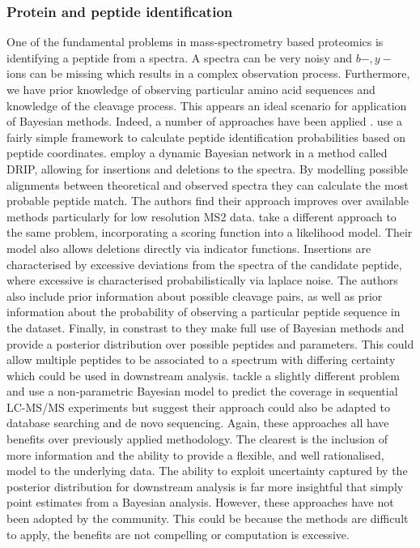 \documentclass[12pt,english]{article}
\begin{document}
\subsubsection{Protein and peptide identification}
One of the fundamental problems in mass-spectrometry based proteomics is identifying a peptide from a spectra. A spectra can be very noisy and $b-,y-$ ions can be missing which results in a complex observation process. Furthermore, we have prior knowledge of observing particular amino acid sequences and knowledge of the cleavage process. This appears an ideal scenario for application of Bayesian methods. Indeed, a number of approaches have been applied \citep{Chen::2005, Halloran::2016, Lewis::2018, Claassen::2009}. \citet{Chen::2005} use a fairly simple framework to calculate peptide identification probabilities based on peptide coordinates. \citet{Halloran::2016} employ a dynamic Bayesian network in a method called DRIP, allowing for insertions and deletions to the spectra. By modelling possible alignments between theoretical and observed spectra they can calculate the most probable peptide match. The authors find their approach improves over available methods particularly for low resolution MS2 data. \citet{Lewis::2018} take a different approach to the same problem, incorporating a scoring function into a likelihood model. Their model also allows deletions directly via indicator functions. Insertions are characterised by excessive deviations from the spectra of the candidate peptide, where excessive is characterised probabilistically via laplace noise. The authors also include prior information about possible cleavage pairs, as well as prior information about the probability of observing a particular peptide sequence in the dataset. Finally, in constrast to \citet{Halloran::2016} they make full use of Bayesian methods and provide a posterior distribution over possible peptides and parameters. This could allow multiple peptides to be associated to a spectrum with differing certainty which could be used in downstream analysis. \citet{Claassen::2009} tackle a slightly different problem and use a non-parametric Bayesian model to predict the coverage in sequential LC-MS/MS experiments but suggest their approach could also be adapted to database searching and de novo sequencing. Again, these approaches all have benefits over previously applied methodology. The clearest is the inclusion of more information and the ability to provide a flexible, and well rationalised, model to the underlying data. The ability to exploit uncertainty captured by the posterior distribution for downstream analysis is far more insightful that simply point estimates from a Bayesian analysis. However, these approaches have not been adopted by the community. This could be because the methods are difficult to apply, the benefits are not compelling or computation is excessive.
\end{document}

